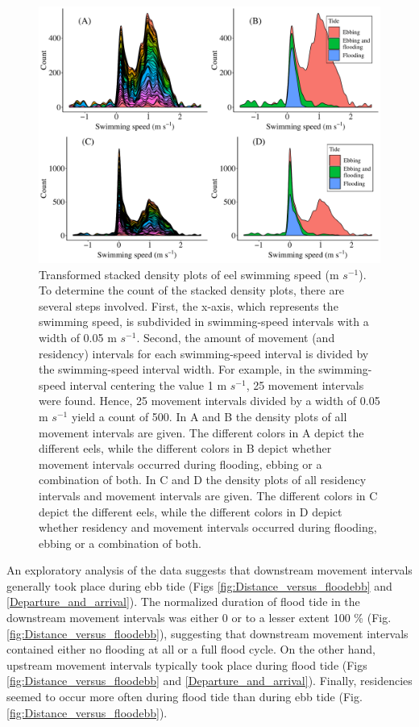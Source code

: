\documentclass[preprint,12pt,authoryear]{elsarticle}
\begin{document}
\begin{figure}[h!]
  \centering\includegraphics[scale=0.45]{density_count_speed.pdf}
  \caption{Transformed stacked density plots of eel swimming speed (m $s^{-1}$). To determine the count of the stacked density plots, there are several steps involved. First, the x-axis, which represents the swimming speed, is subdivided in swimming-speed intervals with a width of 0.05 m $s^{-1}$. Second, the amount of movement (and residency) intervals for each swimming-speed interval is divided by the swimming-speed interval width. For example, in the swimming-speed interval centering the value 1 m $s^{-1}$, 25 movement intervals were found. Hence, 25 movement intervals divided by a width of 0.05 m $s^{-1}$ yield a count of 500. In A and B the density plots of all movement intervals are given. The different colors in A depict the different eels, while the different colors in B depict whether movement intervals occurred during flooding, ebbing or a combination of both. In C and D the density plots of all residency intervals and movement intervals are given. The different colors in C depict the different eels, while the different colors in D depict whether residency and movement intervals occurred during flooding, ebbing or a combination of both. }
  \label{fig:density_count_speed}
\end{figure}

An exploratory analysis of the data suggests that downstream movement intervals generally took place during ebb tide (Figs \ref{fig:Distance_versus_floodebb} and \ref{Departure_and_arrival}). The normalized duration of flood tide in the downstream movement intervals was either 0 or to a lesser extent 100 \% (Fig. \ref{fig:Distance_versus_floodebb}), suggesting that downstream movement intervals contained either no flooding at all or a full flood cycle. On the other hand, upstream movement intervals typically took place during flood tide (Figs \ref{fig:Distance_versus_floodebb} and \ref{Departure_and_arrival}). Finally, residencies seemed to occur more often during flood tide than during ebb tide (Fig. \ref{fig:Distance_versus_floodebb}). 
\end{document}
